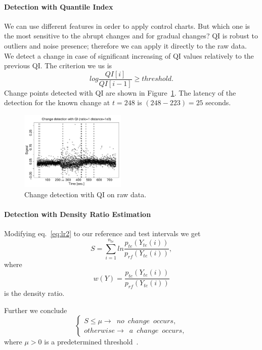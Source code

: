 \paragraph{Detection with Quantile Index}
We can use different features in order to apply control charts.
But which one is the most sensitive to the abrupt changes and for gradual changes?
QI is robust to outliers and noise presence; therefore we can apply it directly to the raw data.
We detect a change in case of significant increasing of QI values relatively to the previous QI.
The criterion we us is 
\begin{equation}\label{QIcriterion}
log \frac {QI[i]}{QI[i-1]} \geq threshold.
\end{equation}
Change points detected with QI are shown in Figure~\ref{figure12}. The latency of the detection for the known change at $t=248$ is $(248-223)=25$ seconds.

\begin{figure}[htb!]
\includegraphics[width=0.45\textwidth]{articles/pics/cfb_paper/PSD/PSDsteadyQI1}
\caption{Change detection with QI on raw data.}\label{figure12}
\end{figure}

\paragraph{Detection with Density Ratio Estimation}

Modifying eq.~\ref{eq:lr2} to our reference and test intervals we get
\begin{equation}\label{KDEformula}
S = \sum_{i=1}^{n_{te}}  ln \frac{p_{te}(Y_{te}(i))}{p_{rf}(Y_{te}(i))},
\end{equation}
where
\begin{equation}
w(Y)=\frac{p_{te}(Y_{te}(i))}{p_{rf}(Y_{te}(i))}
\end{equation}
is the density ratio.

Further we conclude
\begin{equation}
\begin{cases}
S \leq \mu \rightarrow \phantom{1} no \phantom{1} change \phantom{1} occurs, \\
otherwise  \rightarrow \phantom{1} a \phantom{1} change \phantom{1} occurs,
\end{cases}
\end{equation}
where $\mu >0$ is a predetermined threshold~\cite{Kawahara_2009}.

